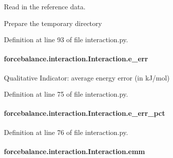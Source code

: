 Read in the reference data. 

Prepare the temporary directory 

Definition at line 93 of file interaction.\-py.

\hypertarget{classforcebalance_1_1interaction_1_1Interaction_a1577e34cd7031365ade75a2a56ec9b0d}{
\paragraph[{e\-\_\-err}]{\setlength{\rightskip}{0pt plus 5cm}forcebalance.\-interaction.\-Interaction.\-e\-\_\-err\hspace{0.3cm}{\ttfamily [inherited]}}}\label{classforcebalance_1_1interaction_1_1Interaction_a1577e34cd7031365ade75a2a56ec9b0d}


Qualitative Indicator\-: average energy error (in k\-J/mol) 



Definition at line 75 of file interaction.\-py.

\hypertarget{classforcebalance_1_1interaction_1_1Interaction_ae66b1b95cac5307950ae787b5409200b}{
\paragraph[{e\-\_\-err\-\_\-pct}]{\setlength{\rightskip}{0pt plus 5cm}forcebalance.\-interaction.\-Interaction.\-e\-\_\-err\-\_\-pct\hspace{0.3cm}{\ttfamily [inherited]}}}\label{classforcebalance_1_1interaction_1_1Interaction_ae66b1b95cac5307950ae787b5409200b}


Definition at line 76 of file interaction.\-py.

\hypertarget{classforcebalance_1_1interaction_1_1Interaction_a2b97abefbf9d9f2b061b9da3b9d0bb30}{
\paragraph[{emm}]{\setlength{\rightskip}{0pt plus 5cm}forcebalance.\-interaction.\-Interaction.\-emm\hspace{0.3cm}{\ttfamily [inherited]}}}\label{classforcebalance_1_1interaction_1_1Interaction_a2b97abefbf9d9f2b061b9da3b9d0bb30}


